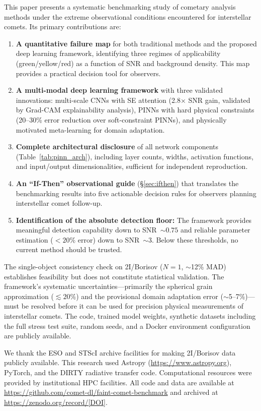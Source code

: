 \documentclass[preprint2]{aastex631}
\begin{document}
This paper presents a systematic benchmarking study of cometary analysis methods under the extreme observational conditions encountered for interstellar comets. Its primary contributions are:

\begin{enumerate}
    \item \textbf{A quantitative failure map} for both traditional methods and the proposed deep learning framework, identifying three regimes of applicability (green/yellow/red) as a function of SNR and background density. This map provides a practical decision tool for observers.
    \item \textbf{A multi-modal deep learning framework} with three validated innovations: multi-scale CNNs with SE attention (2.8$\times$ SNR gain, validated by Grad-CAM explainability analysis), PINNs with hard physical constraints (20--30\% error reduction over soft-constraint PINNs), and physically motivated meta-learning for domain adaptation.
    \item \textbf{Complete architectural disclosure} of all network components (Table~\ref{tab:pinn_arch}), including layer counts, widths, activation functions, and input/output dimensionalities, sufficient for independent reproduction.
    \item \textbf{An ``If-Then'' observational guide} (\S\ref{sec:ifthen}) that translates the benchmarking results into five actionable decision rules for observers planning interstellar comet follow-up.
    \item \textbf{Identification of the absolute detection floor:} The framework provides meaningful detection capability down to SNR~$\sim 0.75$ and reliable parameter estimation ($<20\%$ error) down to SNR~$\sim 3$. Below these thresholds, no current method should be trusted.
\end{enumerate}

The single-object consistency check on 2I/Borisov ($N=1$, $\sim$12\% MAD) establishes feasibility but does not constitute statistical validation. The framework's systematic uncertainties---primarily the spherical grain approximation ($\lesssim 20\%$) and the provisional domain adaptation error ($\sim$5--7\%)---must be resolved before it can be used for precision physical measurements of interstellar comets. The code, trained model weights, synthetic datasets including the full stress test suite, random seeds, and a Docker environment configuration are publicly available.

\begin{acknowledgments}
We thank the ESO and STScI archive facilities for making 2I/Borisov data publicly available. This research used Astropy (\url{https://www.astropy.org}), PyTorch, and the DIRTY radiative transfer code. Computational resources were provided by institutional HPC facilities. All code and data are available at \url{https://github.com/comet-dl/faint-comet-benchmark} and archived at \url{https://zenodo.org/record/[DOI]}.
\end{acknowledgments}
\end{document}
